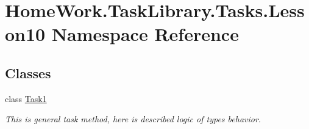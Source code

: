 \hypertarget{namespace_home_work_1_1_task_library_1_1_tasks_1_1_lesson10}{}\section{Home\+Work.\+Task\+Library.\+Tasks.\+Lesson10 Namespace Reference}
\label{namespace_home_work_1_1_task_library_1_1_tasks_1_1_lesson10}
\subsection*{Classes}
\begin{DoxyCompactItemize}
\item 
class \mbox{\hyperlink{class_home_work_1_1_task_library_1_1_tasks_1_1_lesson10_1_1_task1}{Task1}}
\begin{DoxyCompactList}\small\item\em This is general task method, here is described logic of types behavior. \end{DoxyCompactList}\end{DoxyCompactItemize}

